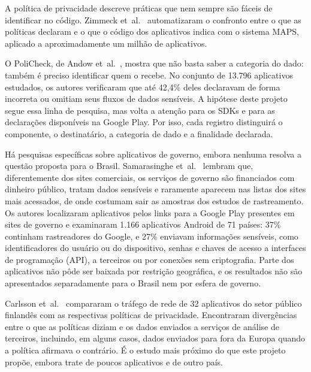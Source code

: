 \label{sec:ref-politicas}

A política de privacidade descreve práticas que nem sempre são fáceis de identificar no código. Zimmeck et~al.~\cite{zimmeck2019} automatizaram o confronto entre o que as políticas declaram e o que o código dos aplicativos indica com o sistema MAPS, aplicado a aproximadamente um milhão de aplicativos.

O PoliCheck, de Andow et~al.~\cite{andow2020}, mostra que não basta saber a categoria do dado: também é preciso identificar quem o recebe. No conjunto de 13.796 aplicativos estudados, os autores verificaram que até 42,4\% deles declaravam de forma incorreta ou omitiam seus fluxos de dados sensíveis. A hipótese deste projeto segue essa linha de pesquisa, mas volta a atenção para os SDKs e para as declarações disponíveis na Google Play. Por isso, cada registro distinguirá o componente, o destinatário, a categoria de dado e a finalidade declarada.

\label{sec:ref-governo}

Há pesquisas específicas sobre aplicativos de governo, embora nenhuma resolva a questão proposta para o Brasil. Samarasinghe et~al.~\cite{samarasinghe2022} lembram que, diferentemente dos sites comerciais, os serviços de governo são financiados com dinheiro público, tratam dados sensíveis e raramente aparecem nas listas dos sites mais acessados, de onde costumam sair as amostras dos estudos de rastreamento. Os autores localizaram aplicativos pelos links para a Google Play presentes em sites de governo e examinaram 1.166 aplicativos Android de 71 países: 37\% continham rastreadores do Google, e 27\% enviavam informações sensíveis, como identificadores do usuário ou do dispositivo, senhas e chaves de acesso a interfaces de programação (API), a terceiros ou por conexões sem criptografia. Parte dos aplicativos não pôde ser baixada por restrição geográfica, e os resultados não são apresentados separadamente para o Brasil nem por esfera de governo.

Carlsson et~al.~\cite{carlsson2022} compararam o tráfego de rede de 32 aplicativos do setor público finlandês com as respectivas políticas de privacidade. Encontraram divergências entre o que as políticas diziam e os dados enviados a serviços de análise de terceiros, incluindo, em alguns casos, dados enviados para fora da Europa quando a política afirmava o contrário. É o estudo mais próximo do que este projeto propõe, embora trate de poucos aplicativos e de outro país.

